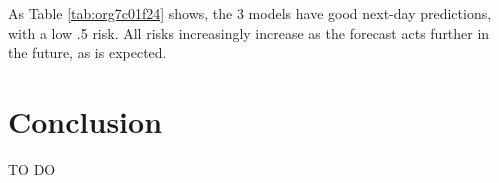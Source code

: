 \documentclass[11pt]{article}
\begin{document}
As Table \ref{tab:org7c01f24} shows, the 3 models have good next-day predictions, with a low .5 risk. All risks increasingly increase as the forecast acts further in the future, as is expected.



\section{Conclusion}
\label{sec:org1109610}

TO DO


{}
\end{document}
